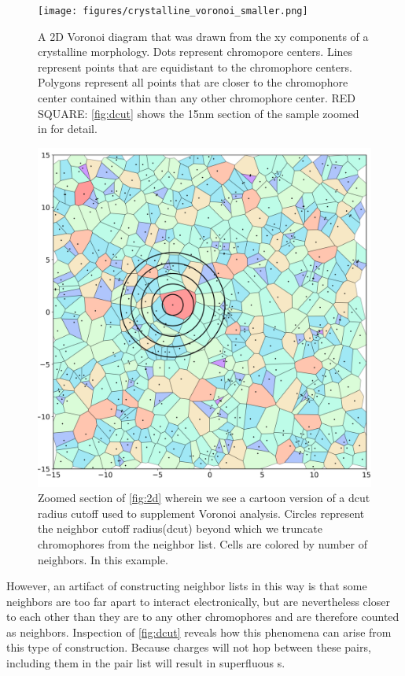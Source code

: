 \begin{figure}
  \center
  \texttt{[image: figures/crystalline\_voronoi\_smaller.png]} 
  \caption{A 2D Voronoi diagram that was drawn from the xy components of a crystalline  morphology. Dots
    represent chromopore centers. Lines represent points that are equidistant to the chromophore centers.
    Polygons represent all points that are closer to the chromophore center contained within than any other
    chromophore center. RED SQUARE: \autoref{fig:dcut} shows the 15nm section of the sample zoomed in for
    detail.}
  \label{fig:2d}
\end{figure}
\begin{figure}
  \center
  \includegraphics[width=\linewidth]{figures/crystalline_voronoi_d_cut_circles.png} 
    \caption{Zoomed section of \autoref{fig:2d} wherein we see a cartoon version of a dcut radius cutoff
    used to supplement Voronoi analysis. Circles represent the neighbor cutoff
    radius(dcut) beyond which we truncate chromophores from the neighbor list.
    Cells are colored by number of neighbors. In this example. }
  \label{fig:dcut}
\end{figure}

However, an artifact of constructing neighbor lists in this way is that some
neighbors are too far apart to interact electronically, but are nevertheless closer to each other than they
are to any other chromophores and are therefore counted as neighbors. 
Inspection of \autoref{fig:dcut} reveals how this phenomena can arise from this type of construction.
Because charges will not hop between these pairs, including them in the pair list will result in 
superfluous s. 

